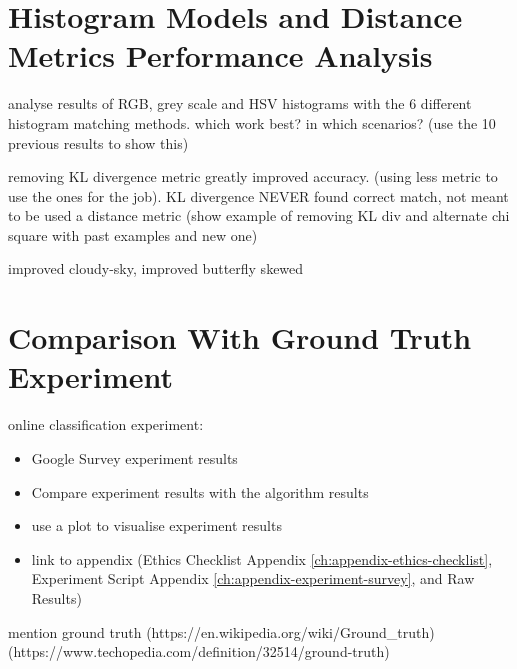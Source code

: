 
\section{Histogram Models and Distance Metrics Performance Analysis}

analyse results of RGB, grey scale and HSV histograms with the 6 different histogram matching methods. which work best? in which scenarios? (use the 10 previous results to show this)

removing KL divergence metric greatly improved accuracy. (using less metric to use the ones for the job). KL divergence NEVER found correct match, not meant to be used a distance metric (show example of removing KL div and alternate chi square with past examples and new one)

improved cloudy-sky,
improved butterfly skewed


\section{Comparison With Ground Truth Experiment}

online classification experiment:
    \begin{itemize}
        \item Google Survey experiment results 
        \item Compare experiment results with the algorithm results
        \item use a plot to visualise experiment results
        \item link to appendix (Ethics Checklist Appendix \ref{ch:appendix-ethics-checklist}, Experiment Script Appendix \ref{ch:appendix-experiment-survey}, and Raw Results)
    \end{itemize}
    
mention ground truth (https://en.wikipedia.org/wiki/Ground\_truth) (https://www.techopedia.com/definition/32514/ground-truth)


